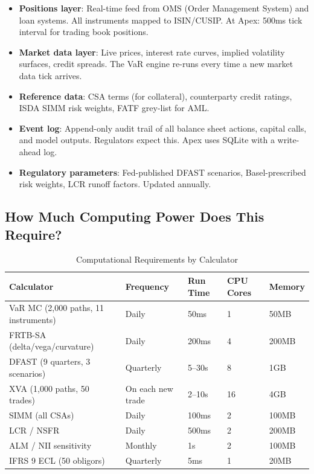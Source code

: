 \documentclass[12pt,a4paper]{article}
\begin{document}
\begin{itemize}[noitemsep]
  \item \textbf{Positions layer}: Real-time feed from OMS (Order Management
        System) and loan systems.  All instruments mapped to ISIN/CUSIP.
        At Apex: 500ms tick interval for trading book positions.
  \item \textbf{Market data layer}: Live prices, interest rate curves, implied
        volatility surfaces, credit spreads.  The VaR engine re-runs every
        time a new market data tick arrives.
  \item \textbf{Reference data}: CSA terms (for collateral), counterparty
        credit ratings, ISDA SIMM risk weights, FATF grey-list for AML.
  \item \textbf{Event log}: Append-only audit trail of all balance sheet
        actions, capital calls, and model outputs.  Regulators expect this.
        Apex uses SQLite with a write-ahead log.
  \item \textbf{Regulatory parameters}: Fed-published DFAST scenarios,
        Basel-prescribed risk weights, LCR runoff factors.  Updated annually.
\end{itemize}

\subsection{How Much Computing Power Does This Require?}

\begin{table}[H]
  \centering
  \caption{Computational Requirements by Calculator}
  \begin{tabular}{lllll}
    \toprule
    Calculator & Frequency & Run Time & CPU Cores & Memory \\
    \midrule
    VaR MC (2,000 paths, 11 instruments) & Daily & 50ms & 1 & 50MB \\
    FRTB-SA (delta/vega/curvature) & Daily & 200ms & 4 & 200MB \\
    DFAST (9 quarters, 3 scenarios) & Quarterly & 5--30s & 8 & 1GB \\
    XVA (1,000 paths, 50 trades) & On each new trade & 2--10s & 16 & 4GB \\
    SIMM (all CSAs) & Daily & 100ms & 2 & 100MB \\
    LCR / NSFR & Daily & 500ms & 2 & 200MB \\
    ALM / NII sensitivity & Monthly & 1s & 2 & 100MB \\
    IFRS 9 ECL (50 obligors) & Quarterly & 5ms & 1 & 20MB \\
    \bottomrule
  \end{tabular}
\end{table}
\end{document}
